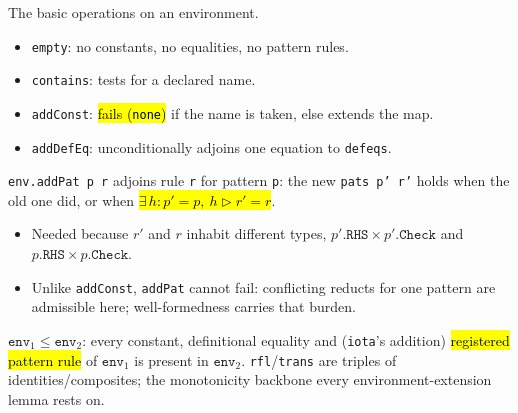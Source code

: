 \begin{definition}
\label{def:venv-basic}
\leanok
{} 

 The basic operations on an environment.
\begin{itemize}
\item \texttt{empty}: no constants, no equalities, no pattern rules.
\item \texttt{contains}: tests for a declared name.
\item \texttt{addConst}: \hl{fails (\texttt{none})} if the name is taken, else extends
the map.
\item \texttt{addDefEq}: unconditionally adjoins one equation to \texttt{defeqs}.
\end{itemize}
\end{definition}

\begin{definition}
\label{def:venv-addpat}
\leanok
{} 

 \texttt{env.addPat p r} adjoins rule \texttt{r} for pattern \texttt{p}: the
new \texttt{pats p' r'} holds when the old one did, or when \hl{$\exists\,h:p'=p,\
h\triangleright r'=r$}.
\begin{itemize}
\item Needed because $r'$ and $r$ inhabit different types,
$p'.\texttt{RHS}\times p'.\texttt{Check}$ and $p.\texttt{RHS}\times p.\texttt{Check}$.
\item \lead{Caveat} Unlike \texttt{addConst}, \texttt{addPat} cannot fail: conflicting
reducts for one pattern are admissible here; well-formedness carries that burden.
\end{itemize}
\end{definition}

\begin{definition}
\label{struct:venv-le}
\leanok
{} 

 $\texttt{env}_1 \le \texttt{env}_2$: every constant, definitional equality
and (\texttt{iota}'s addition) \hl{registered pattern rule} of $\texttt{env}_1$ is present
in $\texttt{env}_2$.
\texttt{rfl}/\texttt{trans} are triples of identities/composites; the monotonicity
backbone every environment-extension lemma rests on.
\end{definition}

